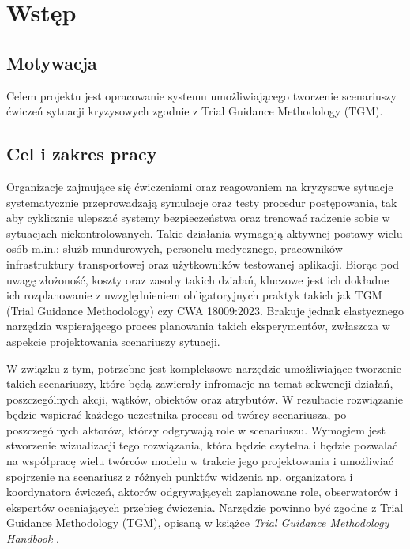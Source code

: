 
\chapter{Wstęp}

\section{Motywacja}
Celem projektu jest opracowanie systemu umożliwiającego tworzenie scenariuszy ćwiczeń sytuacji kryzysowych zgodnie z Trial Guidance Methodology (TGM).

\section{Cel i zakres pracy}
Organizacje zajmujące się ćwiczeniami oraz reagowaniem na kryzysowe sytuacje systematycznie przeprowadzają symulacje oraz testy procedur postępowania, tak aby cyklicznie ulepszać systemy bezpieczeństwa oraz trenować radzenie sobie w sytuacjach niekontrolowanych. Takie działania wymagają aktywnej postawy wielu osób m.in.: służb mundurowych, personelu medycznego, pracowników infrastruktury transportowej oraz użytkowników testowanej aplikacji.
Biorąc pod uwagę złożoność, koszty oraz zasoby takich działań, kluczowe jest ich dokładne ich rozplanowanie z uwzględnieniem obligatoryjnych praktyk takich jak TGM (Trial Guidance Methodology) czy CWA 18009:2023.
Brakuje jednak elastycznego narzędzia wspierającego proces planowania takich eksperymentów, zwłaszcza w
aspekcie projektowania scenariuszy sytuacji.

W związku z tym, potrzebne jest kompleksowe narzędzie umożliwiające tworzenie takich scenariuszy, które będą zawierały infromacje na temat sekwencji działań, poszczególnych akcji, wątków, obiektów oraz atrybutów. W rezultacie rozwiązanie będzie wspierać każdego uczestnika procesu od twórcy scenariusza, po poszczególnych aktorów, którzy odgrywają role w scenariuszu. Wymogiem jest stworzenie wizualizacji tego rozwiązania, która będzie czytelna i będzie pozwalać na współpracę wielu twórców modelu w trakcie jego projektowania i umożliwiać spojrzenie
na scenariusz z różnych punktów widzenia np. organizatora i koordynatora ćwiczeń, aktorów
odgrywających zaplanowane role, obserwatorów i ekspertów oceniających przebieg ćwiczenia.
Narzędzie powinno być zgodne z Trial Guidance Methodology (TGM), opisaną w książce \emph{Trial Guidance Methodology Handbook} \cite{tgmhandbook}.


